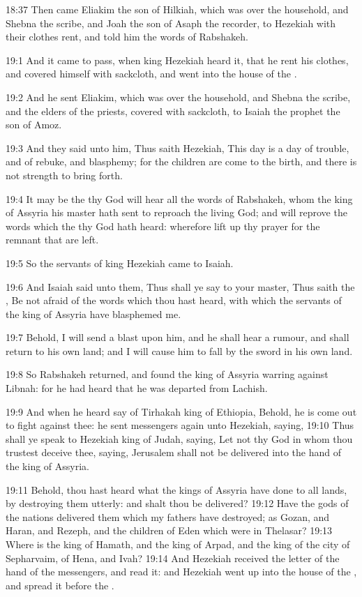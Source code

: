 18:37 Then came Eliakim the son of Hilkiah, which was over the
household, and Shebna the scribe, and Joah the son of Asaph the
recorder, to Hezekiah with their clothes rent, and told him the words
of Rabshakeh.

19:1 And it came to pass, when king Hezekiah heard it, that he rent
his clothes, and covered himself with sackcloth, and went into the
house of the \LORD.

19:2 And he sent Eliakim, which was over the household, and Shebna the
scribe, and the elders of the priests, covered with sackcloth, to
Isaiah the prophet the son of Amoz.

19:3 And they said unto him, Thus saith Hezekiah, This day is a day of
trouble, and of rebuke, and blasphemy; for the children are come to
the birth, and there is not strength to bring forth.

19:4 It may be the \LORD thy God will hear all the words of Rabshakeh,
whom the king of Assyria his master hath sent to reproach the living
God; and will reprove the words which the \LORD thy God hath heard:
wherefore lift up thy prayer for the remnant that are left.

19:5 So the servants of king Hezekiah came to Isaiah.

19:6 And Isaiah said unto them, Thus shall ye say to your master, Thus
saith the \LORD, Be not afraid of the words which thou hast heard, with
which the servants of the king of Assyria have blasphemed me.

19:7 Behold, I will send a blast upon him, and he shall hear a rumour,
and shall return to his own land; and I will cause him to fall by the
sword in his own land.

19:8 So Rabshakeh returned, and found the king of Assyria warring
against Libnah: for he had heard that he was departed from Lachish.

19:9 And when he heard say of Tirhakah king of Ethiopia, Behold, he is
come out to fight against thee: he sent messengers again unto
Hezekiah, saying, 19:10 Thus shall ye speak to Hezekiah king of Judah,
saying, Let not thy God in whom thou trustest deceive thee, saying,
Jerusalem shall not be delivered into the hand of the king of Assyria.

19:11 Behold, thou hast heard what the kings of Assyria have done to
all lands, by destroying them utterly: and shalt thou be delivered?
19:12 Have the gods of the nations delivered them which my fathers
have destroyed; as Gozan, and Haran, and Rezeph, and the children of
Eden which were in Thelasar?  19:13 Where is the king of Hamath, and
the king of Arpad, and the king of the city of Sepharvaim, of Hena,
and Ivah?  19:14 And Hezekiah received the letter of the hand of the
messengers, and read it: and Hezekiah went up into the house of the
\LORD, and spread it before the \LORD.

